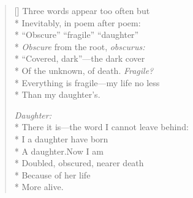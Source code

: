 \label{ch:the_poems_of_summer}
\settowidth{\versewidth}{There it is---the word I cannot leave behind:}
\begin{verse}[\versewidth]
Three words appear too often but\\*
Inevitably, in poem after poem: \\*
``Obscure'' ``fragile'' ``daughter''\\*
\textit{Obscure} from the root, \textit{obscurus:}\\*
``Covered, dark''---the dark cover\\*
Of the unknown, of death. \textit{Fragile?}\\*
Everything is fragile---my life no less\\*
Than my daughter's.

\hspace{4\vgap} \textit{Daughter:}\\*
There it is---the word I cannot leave behind:\\*
I a daughter have born\\*
A daughter.\qquad Now I am\\*
Doubled, obscured, nearer death\\*
Because of her life\\*
More alive.
\end{verse}
